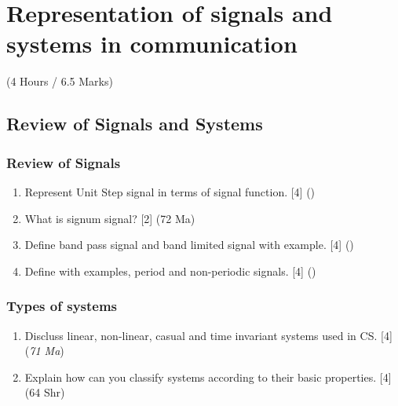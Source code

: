 \documentclass[12pt]{article}
\begin{document}
\pagebreak

\section{Representation of signals and systems in communication}
  \begin{center}(4 Hours / 6.5 Marks)\end{center}

  \subsection{Review of Signals and Systems}
    \subsubsection{Review of Signals}
      \begin{enumerate}
        \item Represent Unit Step signal in terms of signal function. \hfill [4] ()

        \item What is signum signal? \hfill [2] (72 Ma)

        \item Define band pass signal and band limited signal with example. \hfill [4] ()

        \item Define with examples, period and non-periodic signals. \hfill [4] ()
      \end{enumerate}

    \subsubsection{Types of systems}
      \begin{enumerate}
        \item Discluss linear, non-linear, casual and time invariant systems used in CS. \hfill [4] (\textit{71 Ma})

        \item Explain how can you classify systems according to their basic properties. \hfill [4] (64 Shr)
      \end{enumerate}
\end{document}
